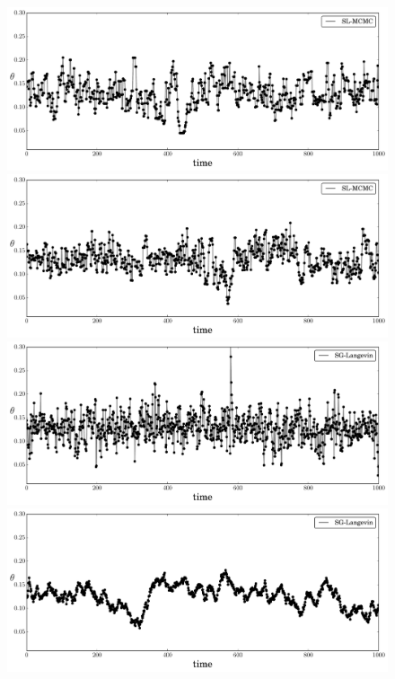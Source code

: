 \documentclass[]{article}
\begin{document}
\begin{figure}[t]
\setlength{\linewidth}{\textwidth}
\setlength{\hsize}{\textwidth}
\begin{center}
\includegraphics[width=0.95\columnwidth]{./images/exp-SL-MCMC-theta-timeseries-omega-rate-100p0-chain0.pdf}
\includegraphics[width=0.95\columnwidth]{./images/exp-SL-MCMC-theta-timeseries-omega-rate-0p01-chain0.pdf}
\includegraphics[width=0.95\columnwidth]{./images/exp-SG-Langevin-theta-timeseries-omega-rate-100p0-chain0.pdf}
\includegraphics[width=0.95\columnwidth]{./images/exp-SG-Langevin-theta-timeseries-omega-rate-0p01-chain0.pdf}

\end{center}
\end{figure}
\end{document}
